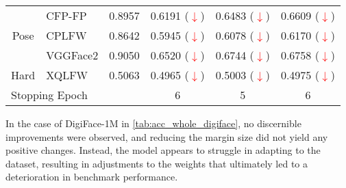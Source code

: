 \documentclass[class=report, crop=false, a4paper, 12pt]{standalone}
\begin{document}
\begin{table}[H]
{\begin{tabular}{|clc|c|c|c|}
    \multicolumn{1}{|c|}{}                          & \multicolumn{1}{l|}{CFP-FP}   & {\color[HTML]{333333} 0.8957} & {\color[HTML]{333333} 0.6191 (\textcolor{red}{$\downarrow$})} & {\color[HTML]{333333} 0.6483 (\textcolor{red}{$\downarrow$})} & {\color[HTML]{333333} 0.6609 (\textcolor{red}{$\downarrow$})} \\ \cline{2-6} 
    \multicolumn{1}{|c|}{\multirow{-2}{*}{Pose}}    & \multicolumn{1}{l|}{CPLFW}    & {\color[HTML]{333333} 0.8642} & {\color[HTML]{333333} 0.5945 (\textcolor{red}{$\downarrow$})} & {\color[HTML]{333333} 0.6078 (\textcolor{red}{$\downarrow$})} & {\color[HTML]{333333} 0.6170 (\textcolor{red}{$\downarrow$})} \\ \hline
    \multicolumn{1}{|c|}{}                          & \multicolumn{1}{l|}{VGGFace2} & {\color[HTML]{333333} 0.9050} & {\color[HTML]{333333} 0.6520 (\textcolor{red}{$\downarrow$})} & {\color[HTML]{333333} 0.6744 (\textcolor{red}{$\downarrow$})} & {\color[HTML]{333333} 0.6758 (\textcolor{red}{$\downarrow$})} \\ \cline{2-6} 
    \multicolumn{1}{|c|}{\multirow{-2}{*}{Hard}}    & \multicolumn{1}{l|}{XQLFW}    & {\color[HTML]{333333} 0.5063} & {\color[HTML]{333333} 0.4965 (\textcolor{red}{$\downarrow$})} & {\color[HTML]{333333} 0.5003 (\textcolor{red}{$\downarrow$})} & {\color[HTML]{333333} 0.4975 (\textcolor{red}{$\downarrow$})} \\ \hline
    \multicolumn{3}{|l|}{Stopping Epoch}                                                                            & 6                                  & 5                                  & 6                                  \\ \hline
    \end{tabular}%
    }
\end{table}

\par In the case of DigiFace-1M in \autoref{tab:acc_whole_digiface}, no discernible improvements were observed, and reducing the margin size did not yield any positive changes. Instead, the model appears to struggle in adapting to the dataset, resulting in adjustments to the weights that ultimately led to a deterioration in benchmark performance.  
\end{document}
